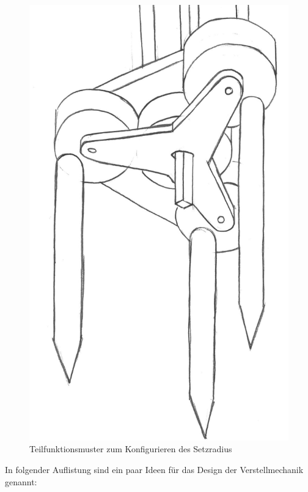 \begin{figure}[H]
	\includegraphics[scale=0.55]{Illustrationen/5-Konzept/blau_Verstellmechanismus.jpg}
	\caption{Teilfunktionsmuster zum Konfigurieren des Setzradius}
	\label{fig:blau_verstellmech}
\end{figure}

In folgender Auflistung sind ein paar Ideen für das Design der Verstellmechanik genannt:

